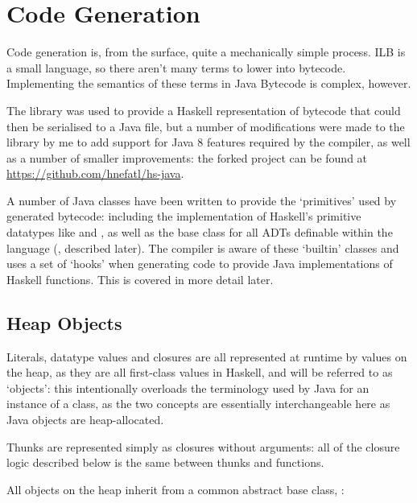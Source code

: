 \documentclass[dissertation.tex]{subfiles}
\begin{document}
\section{Code Generation}
{
    Code generation is, from the surface, quite a mechanically simple process. ILB is a small language, so there aren't many terms to lower into bytecode. Implementing the semantics of these terms in Java Bytecode is complex, however.

    The  library was used to provide a Haskell representation of bytecode that could then be serialised to a Java  file, but a number of modifications were made to the library by me to add support for Java 8 features required by the compiler, as well as a number of smaller improvements: the forked project can be found at \url{https://github.com/hnefatl/hs-java}.

    A number of Java classes have been written to provide the `primitives' used by generated bytecode: including the implementation of Haskell's primitive datatypes like  and , as well as the base class for all ADTs definable within the language (, described later). The compiler is aware of these `builtin' classes and uses a set of `hooks' when generating code to provide Java implementations of Haskell functions. This is covered in more detail later.

    \subsection{Heap Objects}\label{sec:heap-objects}
    {

        Literals, datatype values and closures are all represented at runtime by values on the heap, as they are all first-class values in Haskell, and will be referred to as `objects': this intentionally overloads the terminology used by Java for an instance of a class, as the two concepts are essentially interchangeable here as Java objects are heap-allocated.

        Thunks are represented simply as closures without arguments: all of the closure logic described below is the same between thunks and functions.

        All objects on the heap inherit from a common abstract base class, :

}}
\end{document}
